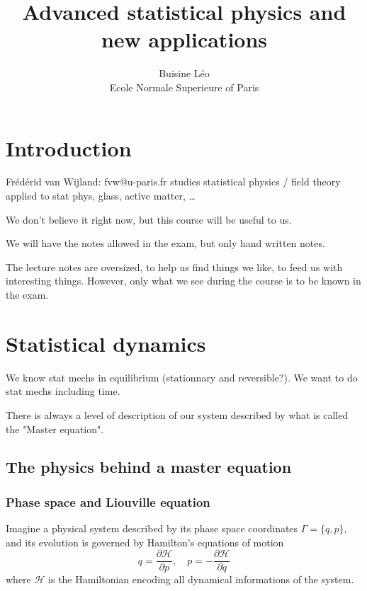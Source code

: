 \documentclass[a4paper]{book}
\theoremstyle{definition}
\theoremstyle{remark}
\begin{document}
\title{Advanced statistical physics and new applications}
\author{Buisine Léo\\Ecole Normale Superieure of Paris}
\maketitle

\tableofcontents

\chapter{Introduction}

Frédérid van Wijland: fvw@u-paris.fr \newline
studies statistical physics / field theory applied to stat phys, glass, active matter, \dots \par \medskip 

We don't believe it right now, but this course will be useful to us. \par \medskip 

We will have the notes allowed in the exam, but only hand written notes. \par \medskip 

The lecture notes are oversized, to help us find things we like, to feed us with interesting things. However, only what we see during the course is to be known in the exam. 

\chapter{Statistical dynamics}

We know stat mechs in equilibrium (stationnary and reversible?). We want to do stat mechs including time. \par \bigskip 

There is always a level of description of our system described by what is called the "Master equation". 

\section{The physics behind a master equation}

\subsection{Phase space and Liouville equation}
Imagine a physical system described by its phase space coordinates $\Gamma = \{q, p\}$, and its evolution is governed by Hamilton's equations of motion 
\begin{equation}
    q = \frac{\partial \mathscr{H}}{\partial p}, \quad p = - \frac{\partial \mathscr{H}}{\partial q}
\end{equation}
where $\mathscr{H}$ is the Hamiltonian encoding all dynamical informations of the system. \par \medskip 
\end{document}
